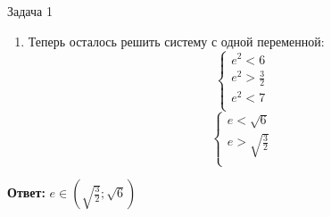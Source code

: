 \begin{mybox}{Задача 1}
\begin{enumerate}
        \item Теперь осталось решить систему с одной переменной: $$\begin{cases}
            e^2<6 \\
            e^2>\frac{3}{2} \\
            e^2<7 \\
        \end{cases}$$
        $$\begin{cases}
            e<\sqrt{6} \\
            e>\sqrt{\frac{3}{2}} \\
        \end{cases}$$
    \end{enumerate}
    \textbf{Ответ:} $e\in (\sqrt{\frac{3}{2}};\sqrt{6})$
\end{mybox}

